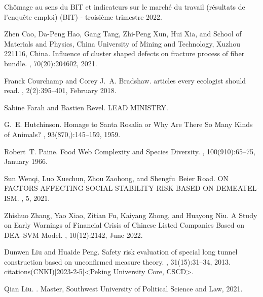\documentclass[12pt]{article}  %
\begin{document}
\newpage
\begin{thebibliography}{100}

Chômage au sens du {BIT} et indicateurs sur le marché du travail (résultats
  de l’enquête emploi) ({BIT}) - troisième trimestre 2022.


Zhen Cao, Da-Peng Hao, Gang Tang, Zhi-Peng Xun, Hui Xia, and {School of
  Materials and Physics, China University of Mining and Technology, Xuzhou
  221116, China}.
\newblock Influence of cluster shaped defects on fracture process of fiber
  bundle.
, 70(20):204602, 2021.

Franck Courchamp and Corey J.~A. Bradshaw.
 articles every ecologist should read.
, 2(2):395--401, February 2018.

Sabine Farah and Bastien Revel.
 {LEAD} {MINISTRY}.

G.~E. Hutchinson.
\newblock Homage to {Santa} {Rosalia} or {Why} {Are} {There} {So} {Many}
  {Kinds} of {Animals}?
, 93(870,):145--159, 1959.


Robert~T. Paine.
\newblock Food {Web} {Complexity} and {Species} {Diversity}.
, 100(910):65--75, January 1966.


Sun Wenqi, Luo Xuechun, Zhou Zaohong, and Shengfu~Beier Road.
 {ON} {FACTORS} {AFFECTING} {SOCIAL} {STABILITY} {RISK}
  {BASED} {ON} {DEMEATEL}-{ISM}.
, 5, 2021.

Zhishuo Zhang, Yao Xiao, Zitian Fu, Kaiyang Zhong, and Huayong Niu.
\newblock A {Study} on {Early} {Warnings} of {Financial} {Crisis} of {Chinese}
  {Listed} {Companies} {Based} on {DEA}–{SVM} {Model}.
, 10(12):2142, June 2022.

Dunwen Liu and Huaide Peng.
\newblock Safety risk evaluation of special long tunnel construction based on unconfirmed measure theory.
, 31(15):31--34, 2013.
 citations(CNKI)[2023-2-5]{\textless}Peking University Core,
  CSCD{\textgreater}.

Qian Liu.
.
\newblock Master, Southwest University of Political Science and Law, 2021.


\end{thebibliography}
\end{document}

